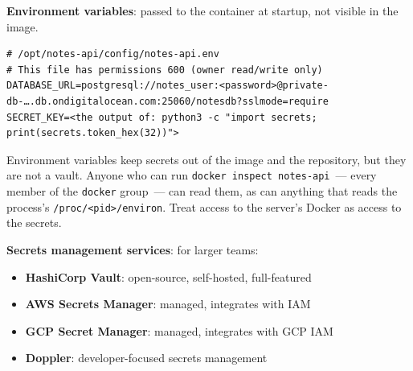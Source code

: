 \textbf{Environment variables}: passed to the container at startup, not visible in the image.

\begin{codebox}[short]

\begin{Shaded}
\begin{Highlighting}[]
 \DataTypeTok{\textbackslash{}}
    \DataTypeTok{\textbackslash{}}
    \DataTypeTok{\textbackslash{}}
\end{Highlighting}
\end{Shaded}

\end{codebox}

\begin{outputbox}[short]
\begin{Verbatim}[fontsize=\codesize, breaklines, breakanywhere, breaksymbolleft={\tiny\textcolor{muted}{$\hookrightarrow$}}]
# /opt/notes-api/config/notes-api.env
# This file has permissions 600 (owner read/write only)
DATABASE_URL=postgresql://notes_user:<password>@private-db-….db.ondigitalocean.com:25060/notesdb?sslmode=require
SECRET_KEY=<the output of: python3 -c "import secrets; print(secrets.token_hex(32))">
\end{Verbatim}
\end{outputbox}

\noindent{}Environment variables keep secrets out of the image and the repository, but they are not a vault. Anyone who can run \texttt{docker\ inspect\ notes-}\allowbreak{}\texttt{api}~--- every member of the \texttt{docker} group~--- can read them, as can anything that reads the process's \texttt{/}\allowbreak{}\texttt{proc/}\allowbreak{}\texttt{\textless{}pid\textgreater{}/}\allowbreak{}\texttt{environ}. Treat access to the server's Docker as access to the secrets.

\textbf{Secrets management services}: for larger teams:

\begin{itemize}
\tightlist
\item
  \textbf{HashiCorp Vault}: open-source, self-hosted, full-featured
\item
  \textbf{AWS Secrets Manager}: managed, integrates with IAM
\item
  \textbf{GCP Secret Manager}: managed, integrates with GCP IAM
\item
  \textbf{Doppler}: developer-focused secrets management
\end{itemize}

